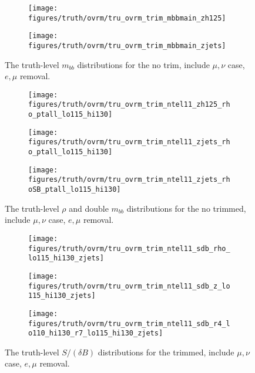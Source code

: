 \begin{figure}[!htbp]\captionsetup{justification=centering}
\begin{center}
\begin{subfigure}[t]{18pc}\centering\texttt{[image: figures/truth/ovrm/tru\_ovrm\_trim\_mbbmain\_zh125]}\caption{}\end{subfigure}
\begin{subfigure}[t]{18pc}\centering\texttt{[image: figures/truth/ovrm/tru\_ovrm\_trim\_mbbmain\_zjets]}\caption{}\end{subfigure}
\caption{\label{fig:mbbtrim}The truth-level $m_{bb}$ distributions for the no trim, include $\mu,\nu$ case, $e,\mu$ removal.}
\end{center}
\end{figure}
\begin{figure}[!htbp]\captionsetup{justification=centering}
\begin{center}
\begin{subfigure}[t]{18pc}\centering\texttt{[image: figures/truth/ovrm/tru\_ovrm\_trim\_ntel11\_zh125\_rho\_ptall\_lo115\_hi130]}\caption{}\end{subfigure}
\begin{subfigure}[t]{18pc}\centering\texttt{[image: figures/truth/ovrm/tru\_ovrm\_trim\_ntel11\_zjets\_rho\_ptall\_lo115\_hi130]}\caption{}\end{subfigure}
\begin{subfigure}[t]{18pc}\centering\texttt{[image: figures/truth/ovrm/tru\_ovrm\_trim\_ntel11\_zjets\_rhoSB\_ptall\_lo115\_hi130]}\caption{}\end{subfigure}
\caption{\label{fig:mbbtrim}The truth-level $\rho$ and double $m_{bb}$ distributions for the no trimmed, include $\mu,\nu$ case, $e,\mu$ removal.}
\end{center}
\end{figure}
\begin{figure}[!htbp]\captionsetup{justification=centering}
\begin{center}
\begin{subfigure}[t]{18pc}\centering\texttt{[image: figures/truth/ovrm/tru\_ovrm\_trim\_ntel11\_sdb\_rho\_lo115\_hi130\_zjets]}\caption{}\end{subfigure}
\begin{subfigure}[t]{18pc}\centering\texttt{[image: figures/truth/ovrm/tru\_ovrm\_trim\_ntel11\_sdb\_z\_lo115\_hi130\_zjets]}\caption{}\end{subfigure}
\begin{subfigure}[t]{18pc}\centering\texttt{[image: figures/truth/ovrm/tru\_ovrm\_trim\_ntel11\_sdb\_r4\_lo110\_hi130\_r7\_lo115\_hi130\_zjets]}\caption{}\end{subfigure}
\caption{\label{fig:mbbtrim}The truth-level $S/(\delta B)$ distributions for the trimmed, include $\mu,\nu$ case, $e,\mu$ removal.}
\end{center}
\end{figure}

